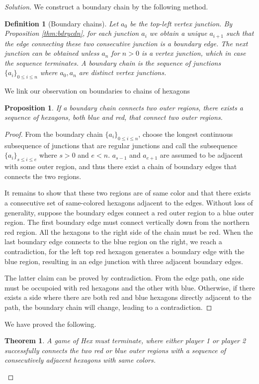 \documentclass{article}
\newtheorem{theorem}{Theorem}
\newtheorem{proposition}{Proposition}
\newtheorem{definition}{Definition}
\begin{document}
\begin{proof}[Solution]
We construct a boundary chain by the following method. 
\begin{definition}[Boundary chains]
    Let $a_0$ be the top-left vertex junction. By Proposition \ref{thm:bdrycdn}, for each junction $a_i$ we obtain a unique $a_{i+1}$ such that the edge connecting these two consecutive junction is a boundary edge. The next junction can be obtained unless $a_n$ for $n > 0$ is a vertex junction, which in case the sequence terminates. A boundary chain is the sequence of junctions $\{a_i\}_{0 \leq i \leq n}$ where $a_0, a_n$ are distinct vertex junctions. 
\end{definition} 

We link our observation on boundaries to chains of hexagons
\begin{proposition}
    If a boundary chain connects two outer regions, there exists a sequence of hexagons, both blue and red, that connect two outer regions. 
\end{proposition}

\begin{proof}
    From the boundary chain $\{a_i\}_{0\leq i \leq n}$, choose the longest continuous subsequence of junctions that are regular junctions and call the subsequence $\{a_i\}_{s \leq i \leq e}$ where $s > 0$ and $e < n$. $a_{s - 1}$ and $a_{e + 1}$ are assumed to be adjacent with some outer region, and thus there exist a chain of boundary edges that connects the two regions. 

    It remains to show that these two regions are of same color and that there exists a consecutive set of same-colored hexagons adjacent to the edges. Without loss of generality, suppose the boundary edges connect a red outer region to a blue outer region. The first boundary edge must connect vertically down from the northern red region. All the hexagons to the right side of the chain must be red. When the last boundary edge connects to the blue region on the right, we reach a contradiction, for the left top red hexagon generates a boundary edge with the blue region, resulting in an edge junction with three adjacent boundary edges. 
    
    The latter claim can be proved by contradiction. From the edge path, one side must be occupoied with red hexagons and the other with blue. Otherwise, if there exists a side where there are both red and blue hexagons directly adjacent to the path, the boundary chain will change, leading to a contradiction. 
\end{proof}

We have proved the following. 

\begin{theorem}
    A game of Hex must terminate, where either player 1 or player 2 successfully connects the two red or blue outer regions with a sequence of consecutively adjacent hexagons with same colors. 
\end{theorem}

\end{proof}
\end{document}
